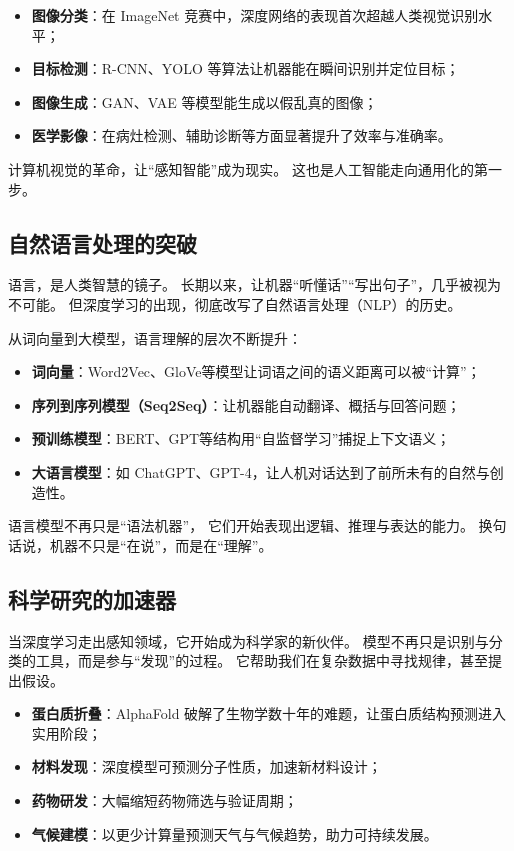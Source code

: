 \begin{itemize}
\item \textbf{图像分类}：在 ImageNet 竞赛中，深度网络的表现首次超越人类视觉识别水平；
\item \textbf{目标检测}：R-CNN、YOLO 等算法让机器能在瞬间识别并定位目标；
\item \textbf{图像生成}：GAN、VAE 等模型能生成以假乱真的图像；
\item \textbf{医学影像}：在病灶检测、辅助诊断等方面显著提升了效率与准确率。
\end{itemize}

计算机视觉的革命，让“感知智能”成为现实。  
这也是人工智能走向通用化的第一步。

\subsection{自然语言处理的突破}

语言，是人类智慧的镜子。  
长期以来，让机器“听懂话”“写出句子”，几乎被视为不可能。  
但深度学习的出现，彻底改写了自然语言处理（NLP）的历史。

从词向量到大模型，语言理解的层次不断提升：

\begin{itemize}
\item \textbf{词向量}：Word2Vec、GloVe等模型让词语之间的语义距离可以被“计算”；
\item \textbf{序列到序列模型（Seq2Seq）}：让机器能自动翻译、概括与回答问题；
\item \textbf{预训练模型}：BERT、GPT等结构用“自监督学习”捕捉上下文语义；
\item \textbf{大语言模型}：如 ChatGPT、GPT-4，让人机对话达到了前所未有的自然与创造性。
\end{itemize}

语言模型不再只是“语法机器”，  
它们开始表现出逻辑、推理与表达的能力。  
换句话说，机器不只是“在说”，而是在“理解”。

\subsection{科学研究的加速器}

当深度学习走出感知领域，它开始成为科学家的新伙伴。  
模型不再只是识别与分类的工具，而是参与“发现”的过程。  
它帮助我们在复杂数据中寻找规律，甚至提出假设。  

\begin{itemize}
\item \textbf{蛋白质折叠}：AlphaFold 破解了生物学数十年的难题，让蛋白质结构预测进入实用阶段；
\item \textbf{材料发现}：深度模型可预测分子性质，加速新材料设计；
\item \textbf{药物研发}：大幅缩短药物筛选与验证周期；
\item \textbf{气候建模}：以更少计算量预测天气与气候趋势，助力可持续发展。
\end{itemize}

